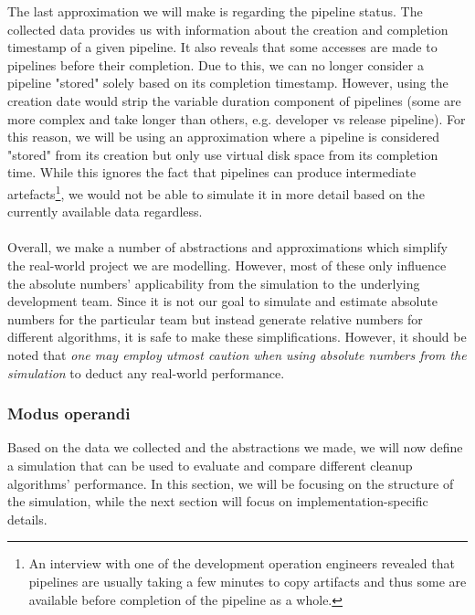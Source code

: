     The last approximation we will make is regarding the pipeline status. The collected data provides us with information about the creation and completion timestamp of a given pipeline. It also reveals that some accesses are made to pipelines before their completion. Due to this, we can no longer consider a pipeline "stored" solely based on its completion timestamp. However, using the creation date would strip the variable duration component of pipelines (some are more complex and take longer than others, e.g. developer vs release pipeline). For this reason, we will be using an approximation where a pipeline is considered "stored" from its creation but only use virtual disk space from its completion time. While this ignores the fact that pipelines can produce intermediate artefacts\footnote{An interview with one of the development operation engineers revealed that pipelines are usually taking a few minutes to copy artifacts and thus some are available before completion of the pipeline as a whole.}, we would not be able to simulate it in more detail based on the currently available data regardless.\\
    \\
    Overall, we make a number of abstractions and approximations which simplify the real-world project we are modelling. However, most of these only influence the absolute numbers' applicability from the simulation to the underlying development team. Since it is not our goal to simulate and estimate absolute numbers for the particular team but instead generate relative numbers for different algorithms, it is safe to make these simplifications. However, it should be noted that \emph{one may employ utmost caution when using absolute numbers from the simulation} to deduct any real-world performance.


\subsubsection{Modus operandi}\label{sec:modus-operandi}
    Based on the data we collected and the abstractions we made, we will now define a simulation that can be used to evaluate and compare different cleanup algorithms' performance. In this section, we will be focusing on the structure of the simulation, while the next section will focus on implementation-specific details.

